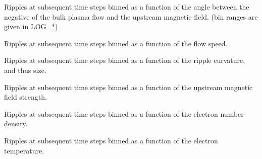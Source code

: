 \documentclass[12pt,a4paper]{article}
\begin{document}
  \setlength{\temptextwidth}{\textwidth}  
  \addtolength{\temptextwidth}{-1.0\parindent}
    
    \parbox[t]{\temptextwidth}{Ripples at subsequent time steps binned as a function of the angle 
                               between the negative of the bulk plasma flow and the upstream magnetic 
                               field. (bin ranges are given in LOG\_$\ast$)}
  
  \vspace{0.5cm}
   
  \setlength{\temptextwidth}{\textwidth}  
  \addtolength{\temptextwidth}{-1.0\parindent}
    
    \parbox[t]{\temptextwidth}{Ripples at subsequent time steps binned as a function of the flow 
                               speed.}
  
  \vspace{0.5cm}
   
  \setlength{\temptextwidth}{\textwidth}  
  \addtolength{\temptextwidth}{-1.0\parindent}
    \parbox[t]{\temptextwidth}{Ripples at subsequent time steps binned as a function of the 
                               ripple curvature, and thus size.}
  
  \vspace{0.5cm}
   
  \setlength{\temptextwidth}{\textwidth}   
  \addtolength{\temptextwidth}{-1.0\parindent}
    
    \parbox[t]{\temptextwidth}{Ripples at subsequent time steps binned as a function of the 
                               upstream magnetic field strength.}

  \vspace{0.5cm}
   
  \setlength{\temptextwidth}{\textwidth}  
  \addtolength{\temptextwidth}{-1.0\parindent}
   
    \parbox[t]{\temptextwidth}{Ripples at subsequent time steps binned as a function of the 
                               electron number density.}
  
  \vspace{0.5cm}
 
  \setlength{\temptextwidth}{\textwidth}  
  \addtolength{\temptextwidth}{-1.0\parindent}
    
    \parbox[t]{\temptextwidth}{Ripples at subsequent time steps binned as a function of the 
                               electron temperature.}
 
\end{document}
